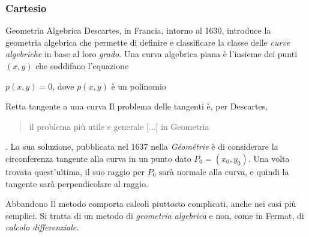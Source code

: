 \begin{frame}[label=Cartesio]
    \frametitle{Cartesio}
    \begin{block}{Geometria Algebrica}
        Descartes, in Francia, intorno al 1630, introduce la \alert{geometria algebrica}
        che permette di definire e classificare la classe delle \textit{curve algebriche}
        in base al loro \textit{grado}.
        Una curva algebrica piana è l'insieme dei punti $(x,y)$ che soddifano l'equazione
        \begin{center}
            $p(x,y) = 0$, dove $p(x,y)$ è un polinomio
        \end{center}
    \end{block}
    \pause
    \begin{block}{Retta tangente a una curva}
        Il problema delle tangenti è, per Descartes, \begin{quote}
            il problema più utile e generale [...] in Geometria
        \end{quote}.
        La sua soluzione, pubblicata nel 1637 nella \textit{Géométrie} è di considerare 
        la circonferenza tangente alla curva in un punto dato $P_0=(x_0,y_0)$. Una volta trovata quest'ultima, il suo
        raggio per $P_0$ sarà normale alla curva, e quindi la tangente sarà
        perpendicolare al raggio.
    \end{block}
    \pause
    \begin{alertblock}{Abbandono}
        Il metodo comporta calcoli piuttosto complicati, anche nei casi più semplici.
        Si tratta di un metodo di \textit{geometria algebrica} e non, come in Fermat,
        di \textit{calcolo differenziale}. \cite{Bourbaki}
    \end{alertblock}

\end{frame}